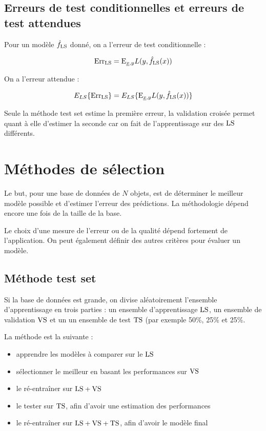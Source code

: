 	\subsection{Erreurs de test conditionnelles et erreurs de test attendues}
	
	Pour un modèle $\hat{f}_{\text{LS}}$ donné, on a l'erreur de test conditionnelle :
	
	$$\text{Err}_{\text{LS}} = \text{E}_{\underline{x}, y}{L(y, \hat{f}_{\text{LS}}(x))}$$
	
	On a l'erreur attendue :
	
	$$E_{LS}\{\text{Err}_{\text{LS}}\} = E_{LS}\{\text{E}_{\underline{x}, y}{L(y, \hat{f}_{\text{LS}}(x))}\}$$
	
	Seule la méthode test set estime la première erreur, la validation croisée permet quant à elle d'estimer la seconde car on fait de l'apprentissage sur des $\text{LS}$ différents.
	
\section{Méthodes de sélection}

Le but, pour une base de données de $N$ objets, est de déterminer le meilleur modèle possible et d'estimer l'erreur des prédictions. La méthodologie dépend encore une fois de la taille de la base.

Le choix d'une mesure de l'erreur ou de la qualité dépend fortement de l'application. On peut également définir des autres critères pour évaluer un modèle.

	\subsection{Méthode test set}
	
	Si la base de données est grande, on divise aléatoirement l'ensemble d'apprentissage en trois parties : un ensemble d'apprentissage $\text{LS}$, un ensemble de validation $\text{VS}$ et un un ensemble de test $\text{TS}$ (par exemple 50\%, 25\% et 25\%.
	
	
	La méthode est la suivante :
	
	\begin{itemize}
		\item apprendre les modèles à comparer sur le $\text{LS}$
		\item sélectionner le meilleur en basant les performances sur $\text{VS}$
		\item le ré-entraîner sur $\text{LS} + \text{VS}$
		\item le tester sur $\text{TS}$, afin d'avoir une estimation des performances
		\item le ré-entraîner sur $\text{LS} + \text{VS} + \text{TS}$, afin d'avoir le modèle final
	\end{itemize}
	
